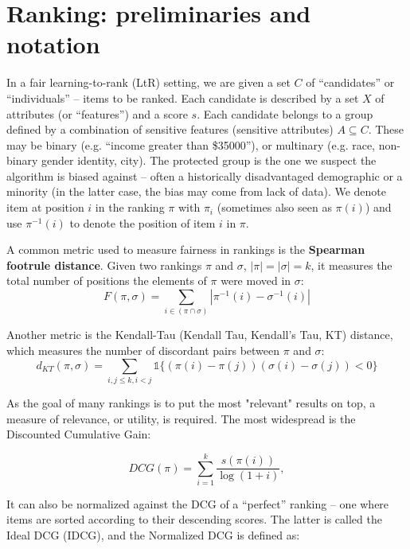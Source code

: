 \section{Ranking: preliminaries and notation}\label{sect:int_2}

In a fair learning-to-rank (LtR) setting, we are given a set $C$ of “candidates” or “individuals” – items to be ranked. Each candidate is described by a set $X$ of attributes (or “features”) and a score $s$. Each candidate belongs to a group defined by a combination of sensitive features (sensitive attributes) $A\subseteq C$. These may be binary (e.g. “income greater than \$35000”), or multinary (e.g. race, non-binary gender identity, city). The protected group is the one we suspect the algorithm is biased against – often a historically disadvantaged demographic or a minority (in the latter case, the bias may come from lack of data). We denote item at position $i$ in the ranking $\pi$ with $\pi_i$ (sometimes also seen as $\pi(i)$) and use $\pi^{-1}(i)$ to denote the position of item $i$ in $\pi$.

A common metric used to measure fairness in rankings is the \textbf{Spearman footrule distance}. Given two rankings $\pi$ and $\sigma$, $|\pi| = |\sigma|=k$, it measures the total number of positions the elements of $\pi$ were moved in $\sigma$:
\begin{equation*}\label{eq:spearman}
F(\pi, \sigma) = \sum_{i \in (\pi \cap \sigma)} |\pi^{-1}(i) - \sigma^{-1}(i)|
\end{equation*}

Another metric is the Kendall-Tau (Kendall Tau, Kendall's Tau, KT) distance, which measures the number of discordant pairs between $\pi$ and $\sigma$:
\begin{equation*}\label{eq:kt}
d_{KT}(\pi, \sigma) = \sum_{i,j \leq k, i < j} \mathbb{1}\{ (\pi(i) - \pi(j))(\sigma(i) - \sigma(j)) < 0 \}
\end{equation*}

As the goal of many rankings is to put the most "relevant" results on top, a measure of relevance, or utility, is required. The most widespread is the Discounted Cumulative Gain:

\[ DCG(\pi) = \sum_{i=1}^k \frac{s(\pi(i))}{\log(1+i)}, \]

It can also be normalized against the DCG of a “perfect” ranking – one where items are sorted according to their descending scores. The latter is called the Ideal DCG (IDCG), and the Normalized DCG is defined as:

